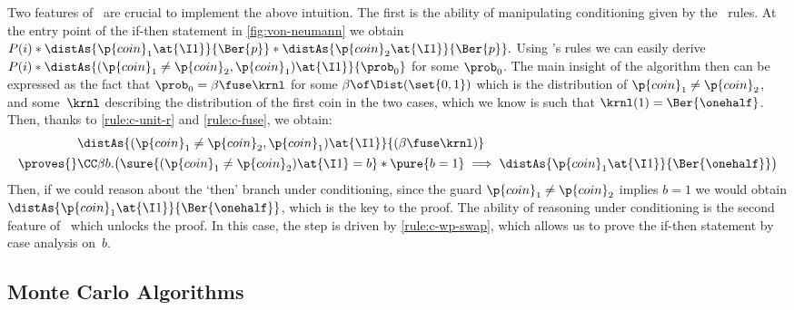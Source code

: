 \documentclass[acmsmall,nonacm,screen,appendix]{acmart}
\begin{document}
Two features of \thelogic\ are crucial to implement the above intuition.
The first is the ability of manipulating conditioning given by the \supercond\ rules.
At the entry point of the if-then statement in \cref{fig:von-neumann}
we obtain
$
  P(i) *
  \distAs{\p{coin}_1\at{\I1}}{\Ber{p}} *
  \distAs{\p{coin}_2\at{\I1}}{\Ber{p}}.
$
Using \thelogic's rules we can easily derive
$
  P(i) *
  \distAs{(\p{coin}_1 \ne \p{coin}_2,\p{coin}_1)\at{\I1}}{\prob_0}
$
for some $\prob_0$.
The main insight of the algorithm then can be expressed as the fact that
$\prob_0 = \beta \fuse \krnl$ for some $\beta\of\Dist(\set{0,1})$
which is the distribution of $\p{coin}_1 \ne \p{coin}_2$,
and some~$\krnl$ describing the distribution of the first coin in the two
cases, which we know is such that $\krnl(1)=\Ber{\onehalf}$.
Then, thanks to \ref{rule:c-unit-r} and \ref{rule:c-fuse}, we obtain:
\begin{align*}
&\distAs{(\p{coin}_1 \ne \p{coin}_2,\p{coin}_1)\at{\I1}}{(\beta \fuse \krnl)}
\\ {}\proves{}&
\CC \beta b. \bigl(
  \sure{(\p{coin}_1 \ne \p{coin}_2)\at{\I1} = b} *
  \pure{b=1} \implies
    \distAs{\p{coin}_1\at{\I1}}{\Ber{\onehalf}}
\bigr)
\end{align*}
Then, if we could reason about the `then' branch under conditioning,
since the guard $\p{coin}_1 \ne \p{coin}_2$ implies $b=1$ we would obtain
$ \distAs{\p{coin}_1\at{\I1}}{\Ber{\onehalf}} $, which is the key to the proof.
The ability of reasoning under conditioning is the second feature
of \thelogic\ which unlocks the proof.
In this case, the step is driven by \cref{rule:c-wp-swap},
which allows us to prove the if-then statement by case analysis on~$b$.



\subsection{Monte Carlo Algorithms}
\label{sec:ex:monte-carlo}
\end{document}
